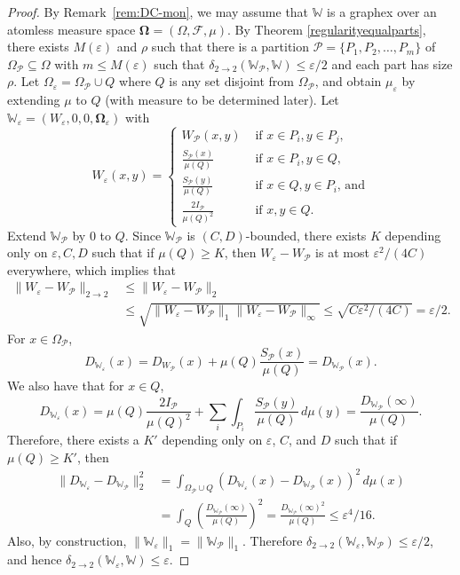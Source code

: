 \documentclass{amsart}
\numberwithin{equation}{section}
\numberwithin{figure}{section}
\theoremstyle{definition}
\theoremstyle{remark}
\newcommand{\bOmega}{{\mathbf{\Omega}}}
\newcommand{\cP}{\mathcal{P}}
\newcommand{\cW}{\mathbb{W}}
\newcommand{\cF}{\mathcal{F}}
\newcommand{\sP}{\mathscr{P}}
\newcommand{\deltt}{\delta_{2\to 2}}
\begin{document}
\begin{proof}
By Remark~\ref{rem:DC-mon}, we may assume that $\cW$ is a graphex over an
atomless measure space $\bOmega=(\Omega,\cF,\mu)$. By Theorem
\ref{regularityequalparts}, there exists $M(\varepsilon)$ and $\rho$ such
that there is a partition $\cP=\{P_1,P_2,\dots,P_m\}$ of $\Omega_\sP
\subseteq \Omega$ with $m \le M(\varepsilon)$ such that $\deltt(\cW_\sP,\cW)
\le \varepsilon/2$ and each part has size $\rho$. Let
$\Omega_\varepsilon=\Omega _\sP \cup Q$ where $Q$ is any set disjoint from
$\Omega_\sP$, and obtain $\mu_\varepsilon$ by extending $\mu$ to $Q$ (with
measure to be determined later). Let
$\cW_\varepsilon=(W_\varepsilon,0,0,\bOmega_\varepsilon)$ with
\[
W_\varepsilon(x,y) = \begin{cases}
W_\sP(x,y) &\text{ if $x \in P_i, y \in P_j$,}\\
\frac{S_\sP(x)}{\mu(Q)} &\text{ if $x \in P_i, y \in Q$,}\\
\frac{S_\sP(y)}{\mu(Q)} &\text{ if $x \in Q, y \in P_i$, and}\\
\frac{2I_\sP}{\mu(Q)^2} &\text{ if $x,y \in Q$.}
\end{cases}
\] Extend $\cW_\sP$ by $0$ to $Q$. Since $\cW_\sP$ is $(C,D)$-bounded, there
exists $K$ depending only on $\varepsilon,C,D$ such that if $\mu(Q) \ge K$,
then $W_\varepsilon-W_{\sP}$ is at most $\varepsilon^2/(4C)$ everywhere,
which implies that
\begin{align*}
\|W_\varepsilon-W_\sP\|_{2 \rightarrow 2} &\le \|W_\varepsilon-W_\sP\|_{2}\\
& \le \sqrt{\|W_\varepsilon-W_\sP\|_{1} \|W_\varepsilon-W_\sP\|_{\infty}}
 \le \sqrt{C\varepsilon^2/(4C)}
 = \varepsilon/2
.
\end{align*}
For $x \in \Omega_{\cP}$,
\[D_{\cW_\varepsilon}(x)=D_{W_{\cP}}(x)+ \mu(Q) \frac{S_{\cP}(x)}{\mu(Q)}=D_{\cW_{\cP}}(x)
.\]
We also have that for $x \in Q$,
\[D_{\cW_\varepsilon}(x)=\mu(Q) \frac{2I_\sP}{\mu(Q)^2}+ \sum_{i} \int_{P_i} \frac{S_\sP(y)}{\mu(Q)}\,d\mu(y)=\frac{D_{\cW_\sP}(\infty)}{\mu(Q)}.
\]
Therefore, there exists a $K'$ depending only on $\varepsilon$, $C$, and $D$
such that if $\mu(Q) \ge K'$, then
\begin{align*}
\|D_{\cW_\varepsilon}-D_{\cW_\sP}\|_2^2 &=\int_{\Omega_\sP \cup Q} \left(D_{\cW_\varepsilon}(x)-D_{\cW_\sP}(x)\right)^2 \,d\mu(x)\\
&=\int_Q \left(\frac{D_{\cW_\sP}(\infty)}{\mu(Q)}\right)^2
= \frac{D_{\cW_\sP}(\infty)^2}{\mu(Q)} \le \varepsilon^4/16
.
\end{align*}
Also, by construction, $\|\cW_\varepsilon\|_1=\|\cW_\sP\|_1$. Therefore
$\deltt(\cW_\varepsilon,\cW_\sP) \le \varepsilon/2$, and hence
$\deltt(\cW_\varepsilon,\cW) \le \varepsilon$.
\end{proof}
\end{document}
